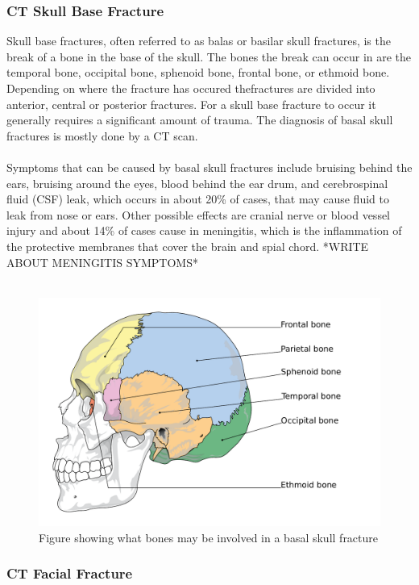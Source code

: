\documentclass[11pt]{article}
\begin{document}
\subsubsection{CT Skull Base Fracture}
Skull base fractures, often referred to as balas or basilar skull fractures, is the break of a bone in the base of the skull. The bones the break can occur in are the temporal bone, occipital bone, sphenoid bone, frontal bone, or ethmoid bone. Depending on where the fracture has occured thefractures are divided into anterior, central or posterior fractures. For a skull base fracture to occur it generally requires a significant amount of trauma. The diagnosis of basal skull fractures is mostly done by a CT scan.\cite{BasilarSkullFracture2021}\\
\\
Symptoms that can be caused by basal skull fractures include bruising behind the ears, bruising around the eyes, blood behind the ear drum, and cerebrospinal fluid (CSF) leak, which occurs in about 20\% of cases, that may cause fluid to leak from nose or ears. Other possible effects are cranial nerve or blood vessel injury and about 14\% of cases cause in meningitis, which is the inflammation of the protective membranes that cover the brain and spial chord.\cite{BasilarSkullFracture2021} *WRITE ABOUT MENINGITIS SYMPTOMS*\\
\\
\begin{figure}[ht]
  \centering
  \includegraphics[width=12cm]{graphics/cranial_bones.pdf}
  \caption{Figure showing what bones may be involved in a basal skull fracture}
\end{figure}

\subsubsection{CT Facial Fracture}
\end{document}
